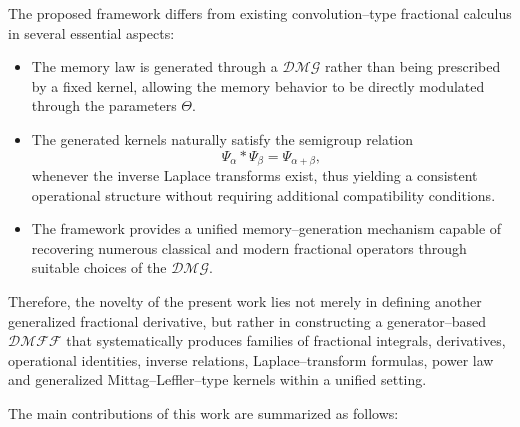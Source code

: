 \documentclass[11pt]{article}
\numberwithin{equation}{section}
\begin{document}
The proposed framework differs from existing convolution--type fractional calculus in several essential aspects:
\begin{itemize}[itemsep=1pt, topsep=1pt, parsep=0pt, partopsep=0pt]

\item
The memory law is generated through a $\mathcal{DMG}$ rather than being prescribed by a fixed kernel, allowing the memory behavior to be directly modulated through the parameters $\Theta$.

\item
The generated kernels naturally satisfy the semigroup relation
\[
\Psi_\alpha * \Psi_\beta
=
\Psi_{\alpha+\beta},
\]
whenever the inverse Laplace transforms exist, thus yielding a consistent operational structure without requiring additional compatibility conditions.

\item
The framework provides a unified memory--generation mechanism capable of recovering numerous classical and modern fractional operators through suitable choices of the $\mathcal{DMG}$.

\end{itemize}
Therefore, the novelty of the present work lies not merely in defining another generalized fractional derivative, but rather in constructing a generator--based $\mathcal{DMFF}$ that systematically produces families of fractional integrals, derivatives, operational identities, inverse relations, Laplace--transform formulas, power law and generalized Mittag--Leffler--type kernels within a unified setting.

\medskip

The main contributions of this work are summarized as follows:

\medskip
\end{document}

